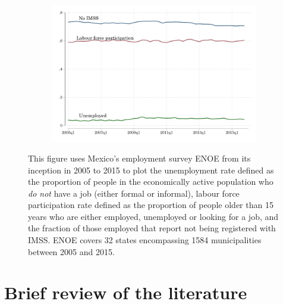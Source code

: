 \documentclass[oneside,11pt]{article}
\begin{document}
\vspace{.2in}
\begin{figure}[H]
     \caption{Unemployment rate, labour force participation rate and fraction of workers without IMSS}
     \vspace{-.2in}
    \label{informal_time}
\begin{center}
\begin{subfigure}{0.55\textwidth}
        \includegraphics[width=\textwidth]{Figuras/unemp_noimss_labforce.pdf}
    \end{subfigure}
  \end{center}
    \scriptsize 
    This figure uses Mexico's employment survey ENOE from its inception in 2005 to 2015 to plot the unemployment rate defined as the proportion of people in the economically active population who \textit{do not} have a job (either formal or informal), labour force participation rate defined as the proportion of people older than 15 years who are either employed, unemployed or looking for a job, and the fraction of those employed that report not being registered with IMSS. ENOE covers 32 states encompassing 1584 municipalities between 2005 and 2015.
\end{figure}



\section{Brief review of the literature} \label{literature}
\end{document}
